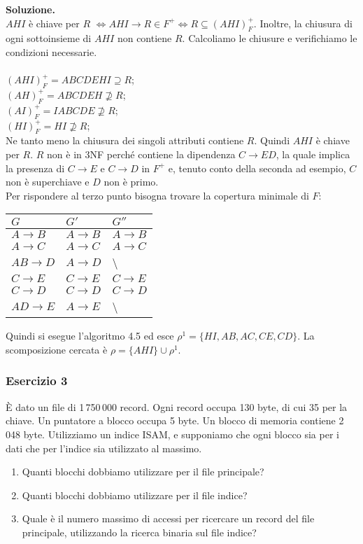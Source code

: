  \noindent\textbf{\fontsize{14pt}{1em}Soluzione.}\\
 $AHI$ è chiave per $R$ $\Leftrightarrow AHI \rightarrow R\in F^+ \Leftrightarrow R \subseteq (AHI)^+_F$. Inoltre, la chiusura
 di ogni sottoinsieme di $AHI$ non contiene $R$.
 Calcoliamo le chiusure e verifichiamo le condizioni necessarie.\\\\
 $(AHI)^+_F = ABCDEHI \supseteq R$;\\
 $(AH)^+_F = ABCDEH \not\supseteq R$;\\
 $(AI)^+_F = IABCDE \not\supseteq R$;\\
 $(HI)^+_F = HI \not\supseteq R$;\\
 Ne tanto meno la chiusura dei singoli attributi contiene $R$. Quindi $AHI$ è chiave per $R$. $R$ non è in 3NF perché contiene
 la dipendenza $C\rightarrow ED$, la quale implica la presenza di $C \rightarrow E$ e $C\rightarrow D$ in $F^+$ e, tenuto conto
 della seconda ad esempio, $C$ non è superchiave e $D$ non è primo.\\

Per rispondere al terzo punto bisogna trovare la copertura minimale di $F$:
\begin{center}
 \begin{tabular}{l|l|l}
  $G$ & $G'$ & $G''$\\
  \hline
  $A\rightarrow B$ & $A\rightarrow B$ & $A\rightarrow B$ \\
  $A \rightarrow C$ & $A \rightarrow C$ & $A \rightarrow C$\\
  $AB \rightarrow D$ & $A \rightarrow D$ & \textbackslash \\ 
  $C \rightarrow E$ & $C \rightarrow E$ & $C \rightarrow E$\\
  $C \rightarrow D$ & $C \rightarrow D$ & $C \rightarrow D$\\
  $AD \rightarrow E$ & $A \rightarrow E$ & \textbackslash\\ 
 \end{tabular}
\end{center}
Quindi si esegue l'algoritmo 4.5 ed esce $\rho^1= \{HI, AB, AC, CE, CD\}$. La scomposizione cercata è
$\rho = \{AHI\} \cup \rho^1$.

\subsubsection{Esercizio 3}
\`E dato un file di 1\,750\,000 record. Ogni record occupa 130 byte, di cui 35 per la chiave. Un puntatore a blocco occupa 5 byte.
Un blocco di memoria contiene 2\,048 byte. Utilizziamo un indice ISAM, e supponiamo che ogni blocco sia per i dati che per l'indice 
sia utilizzato al massimo. 
\begin{enumerate}
 \item Quanti blocchi dobbiamo utilizzare per il file principale? 
 \item Quanti blocchi dobbiamo utilizzare per il file indice?
 \item Quale è il numero massimo di accessi per ricercare un record del file principale, utilizzando 
 la ricerca binaria sul file indice?
\end{enumerate}

